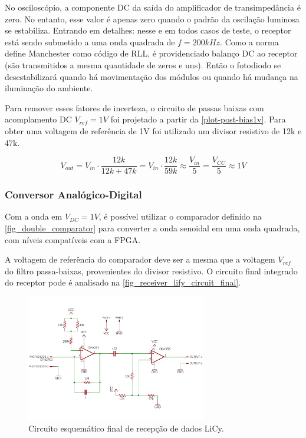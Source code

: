 	No osciloscópio, a componente DC da saída do amplificador de transimpedância é zero. No entanto, esse valor é apenas zero quando o padrão da oscilação luminosa se estabiliza. Entrando em detalhes: nesse e em todos casos de teste, o receptor está sendo submetido a uma onda quadrada de $f = 200kHz$. Como a norma define Manchester como código de RLL, é providenciado balanço DC ao receptor (são transmitidos a mesma quantidade de zeros e uns). Então o fotodiodo se desestabilizará quando há movimentação dos módulos ou quando há mudança na iluminação do ambiente.
	
	Para remover esses fatores de incerteza, o circuito de passas baixas com acomplamento DC $V_{ref} = 1V$ foi projetado a partir da \autoref{plot-post-bias1v}. Para obter uma voltagem de referência de 1V foi utilizado um divisor resistivo de 12k e 47k. 
	
	\begin{equation}
	V_{out} = V_{in} \cdot \frac{12k}{12k + 47k} = V_{in} \cdot \frac{12k}{59k} \approx \frac{V_{in}}{5} = \frac{V_{CC}}{5} \approx 1V
	\end{equation}
	
	\subsubsection{Conversor Analógico-Digital}
	
	Com a onda em $V_{DC} = 1V$, é possível utilizar o comparador definido na \autoref{fig_double_comparator} para converter a onda senoidal em uma onda quadrada, com níveis compatíveis com a FPGA.
	
	A voltagem de referência do comparador deve ser a mesma que a voltagem $V_{ref}$ do filtro passa-baixas, provenientes do divisor resistivo. O circuito final integrado do receptor pode é analisado na \autoref{fig_receiver_lify_circuit_final}.

	\begin{figure}[htb]
		\caption{\label{fig_receiver_lify_circuit_final}Circuito esquemático final de recepção de dados LiCy.}
		\centering
		\includegraphics[width=0.7\textwidth, trim={0cm 1cm 0cm 1cm}, clip]{circuits/receiver_lify_final.pdf}
	\end{figure}
	
